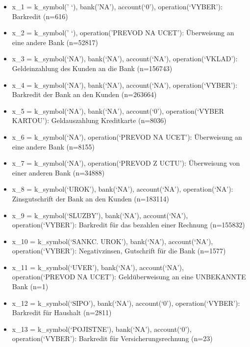 \documentclass[]{article}
\begin{document}
\begin{itemize}
\item
  x\_1 = k\_symbol(' `), bank('NA'), account(`0'), operation(`VYBER'):
  Barkredit (n=616)
\item
  x\_2 = k\_symbol(' `), operation('PREVOD NA UCET'): Überweisung an
  eine andere Bank (n=52817)
\item
  x\_3 = k\_symbol(`NA'), bank(`NA'), account(`NA'), operation(`VKLAD'):
  Geldeinzahlung des Kunden an die Bank (n=156743)
\item
  x\_4 = k\_symbol(`NA'), bank(`NA'), account(`NA'), operation(`VYBER'):
  Barkredit der Bank an den Kunden (n=263664)
\item
  x\_5 = k\_symbol(`NA'), bank(`NA'), account(`0'), operation(`VYBER
  KARTOU'): Geldauszahlung Kreditkarte (n=8036)
\item
  x\_6 = k\_symbol(`NA'), operation(`PREVOD NA UCET'): Überweisung an
  eine andere Bank (n=8155)
\item
  x\_7 = k\_symbol(`NA'), operation(`PREVOD Z UCTU'): Überweisung von
  einer anderen Bank (n=34888)
\item
  x\_8 = k\_symbol(`UROK'), bank(`NA'), account(`NA'), operation(`NA'):
  Zinsgutschrift der Bank an den Kunden (n=183114)
\item
  x\_9 = k\_symbol(`SLUZBY'), bank(`NA'), account(`NA'),
  operation(`VYBER'): Barkredit für das bezahlen einer Rechnung
  (n=155832)
\item
  x\_10 = k\_symbol(`SANKC. UROK'), bank(`NA'), account(`NA'),
  operation(`VYBER'): Negativzinsen, Gutschrift für die Bank (n=1577)
\item
  x\_11 = k\_symbol(`UVER'), bank(`NA'), account(`NA'),
  operation(`PREVOD NA UCET'): Geldüberweisung an eine UNBEKANNTE Bank
  (n=1)
\item
  x\_12 = k\_symbol(`SIPO'), bank(`NA'), account(`0'),
  operation(`VYBER'): Barkredit für Haushalt (n=2811)
\item
  x\_13 = k\_symbol(`POJISTNE'), bank(`NA'), account(`0'),
  operation(`VYBER'): Barkredit für Versicherungsrechnung (n=23)
\end{itemize}
\end{document}
